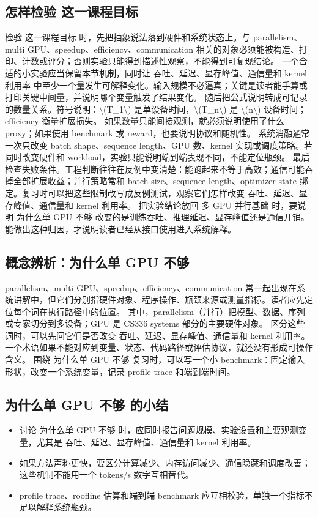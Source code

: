 \documentclass[a4paper]{article}
\begin{document}
\subsection{怎样检验 这一课程目标}
检验 这一课程目标 时，先把抽象说法落到硬件和系统状态上。与 parallelism、multi GPU、speedup、efficiency、communication 相关的对象必须能被构造、打印、计数或评分；否则实验只能得到描述性观察，不能得到可复现结论。
一个合适的小实验应当保留本节机制，同时让 吞吐、延迟、显存峰值、通信量和 kernel 利用率 中至少一个量发生可解释变化。输入规模不必逼真；关键是读者能手算或打印关键中间量，并说明哪个变量触发了结果变化。
随后把公式说明转成可记录的数量关系。符号说明：\textbackslash{}(T\_1\textbackslash{}) 是单设备时间，\textbackslash{}(T\_n\textbackslash{}) 是 \textbackslash{}(n\textbackslash{}) 设备时间；efficiency 衡量扩展损失。 如果数量只能间接观测，就必须说明使用了什么 proxy；如果使用 benchmark 或 reward，也要说明协议和随机性。
系统消融通常一次只改变 batch shape、sequence length、GPU 数、kernel 实现或调度策略。若同时改变硬件和 workload，实验只能说明端到端表现不同，不能定位瓶颈。
最后检查失败条件。工程判断往往在反例中变清楚：能跑起来不等于高效；通信可能吞掉全部扩展收益；并行策略常和 batch size、sequence length、optimizer state 绑定。复习时可以把这些限制改写成反例测试，观察它们怎样改变 吞吐、延迟、显存峰值、通信量和 kernel 利用率。
把实验结论放回 多 GPU 并行基础 时，要说明 为什么单 GPU 不够 改变的是训练吞吐、推理延迟、显存峰值还是通信开销。能做出这种归因，才说明读者已经从接口使用进入系统解释。
\subsection{概念辨析：为什么单 GPU 不够}
parallelism、multi GPU、speedup、efficiency、communication 常一起出现在系统讲解中，但它们分别指硬件对象、程序操作、瓶颈来源或测量指标。读者应先定位每个词在执行路径中的位置。
其中，parallelism（并行）把模型、数据、序列或专家切分到多设备；GPU 是 CS336 systems 部分的主要硬件对象。
区分这些词时，可以先问它们是否改变 吞吐、延迟、显存峰值、通信量和 kernel 利用率。一个术语如果不能对应到变量、状态、代码路径或评估协议，就还没有形成可操作含义。
围绕 为什么单 GPU 不够 复习时，可以写一个小 benchmark：固定输入形状，改变一个系统变量，记录 profile trace 和端到端时间。
\subsection{为什么单 GPU 不够 的小结}
\begin{itemize}
\item 讨论 为什么单 GPU 不够 时，应同时报告问题规模、实验设置和主要观测变量，尤其是 吞吐、延迟、显存峰值、通信量和 kernel 利用率。
\item 如果方法声称更快，要区分计算减少、内存访问减少、通信隐藏和调度改善；这些机制不能用一个 tokens/s 数字互相替代。
\item profile trace、roofline 估算和端到端 benchmark 应互相校验，单独一个指标不足以解释系统瓶颈。
\end{itemize}
\end{document}
